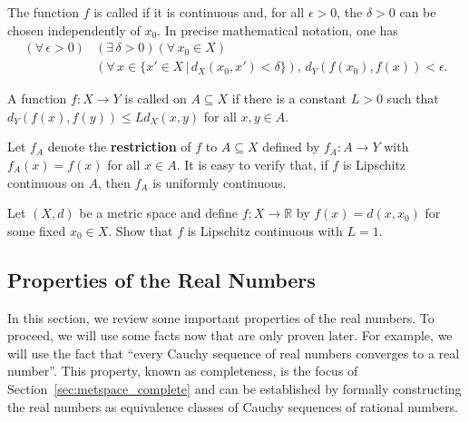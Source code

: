 \begin{definition}
The function $f$ is called  if it is continuous and, for all $\epsilon > 0$, the $\delta >0$ can be chosen independently of $x_0$.
In precise mathematical notation, one has
\begin{equation*}
\begin{split}
(\forall \, \epsilon >0)  & ( \exists \, \delta >0) (\forall \, x_0 \in X) \\ & (\forall \, x \in \{x'\in X\,|\,d_X (x_0,x')<\delta\}), \,
  d_Y \left( f(x_0),f(x) \right) < \epsilon .
\end{split}
\end{equation*}
\end{definition}

\begin{definition}
A function $f  \colon X \rightarrow Y$ is called  on $A \subseteq X$ if there is a constant $L>0$ such that $d_Y (f(x),f(y)) \leq L d_X (x,y)$ for all $x,y\in A$.
\end{definition}

Let $f_A$ denote the \textbf{restriction} of $f$ to $A\subseteq X$ defined by $f_A \colon A \to Y$ with $f_A (x) = f(x)$ for all $x\in A$.
It is easy to verify that, if $f$ is Lipschitz continuous on $A$, then $f_A$ is uniformly continuous.

\begin{problem}
Let $(X,d)$ be a metric space and define $f: X \to \mathbb{R}$ by $f(x)=d(x,x_0)$ for some fixed $x_0 \in X$.
Show that $f$ is Lipschitz continuous with $L=1$.
\end{problem}


\subsection{Properties of the Real Numbers}

In this section, we review some important properties of the real numbers.
To proceed, we will use some facts now that are only proven later.
For example, we will use the fact that ``every Cauchy sequence of real numbers converges to a real number''.
This property, known as completeness, is the focus of Section~\ref{sec:metspace_complete} and can be established by formally constructing the real numbers as equivalence classes of Cauchy sequences of rational numbers.

